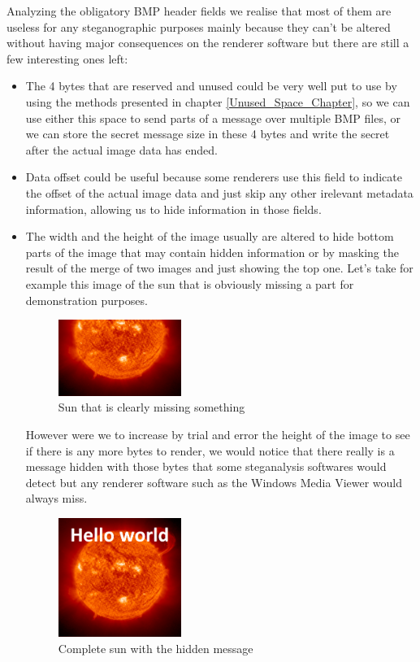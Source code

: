 \begin{multicols*}{2}
Analyzing the obligatory BMP header fields we realise that most of them are useless for any steganographic purposes mainly because they can't be altered without having major consequences on the renderer software but there are still a few interesting ones left:
\begin{itemize}
  \item The 4 bytes that are reserved and unused could be very well put to use by using the methods presented in chapter \ref{Unused_Space_Chapter}, so we can use either this space to send parts of a message over multiple BMP files, or we can store the secret message size in these 4 bytes and write the secret after the actual image data has ended.
  \item Data offset could be useful because some renderers use this field to indicate the offset of the actual image data and just skip any other irelevant metadata information, allowing us to hide information in those fields.
  \item The width and the height of the image usually are altered to hide bottom parts of the image that may contain hidden information or by masking the result of the merge of two images and just showing the top one. Let's take for example this image of the sun that is obviously missing a part for demonstration purposes.

\begin{figure}[H]
    \centering
    \includegraphics[width=4cm,keepaspectratio]{pics/height_modification_steganography_cut}
    \caption{Sun that is clearly missing something}
    \label{Sun_Missing_Part}
\end{figure}

However were we to increase by trial and error the height of the image to see if there is any more bytes to render, we would notice that there really is a message hidden with those bytes that some steganalysis softwares would detect but any renderer software such as the Windows Media Viewer would always miss.

\begin{figure}[H]
    \centering
    \includegraphics[width=4cm,keepaspectratio]{pics/height_modification_steganography_original}
    \caption{Complete sun with the hidden message}
    \label{Sun_Original}
\end{figure}
\end{itemize}


\end{multicols*}

